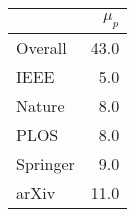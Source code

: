 \begin{tabular}{lr}
\toprule
{} &  $\mu_p$ \\
\midrule
Overall  &     43.0 \\
IEEE     &      5.0 \\
Nature   &      8.0 \\
PLOS     &      8.0 \\
Springer &      9.0 \\
arXiv    &     11.0 \\
\bottomrule
\end{tabular}

